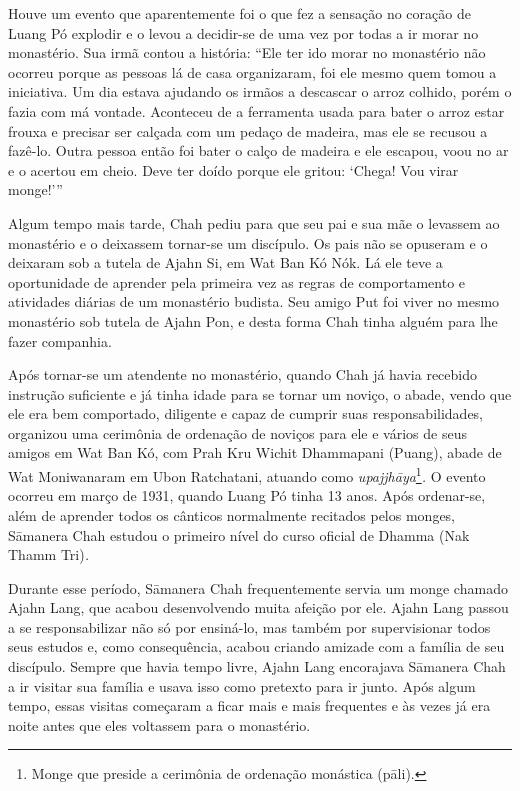 Houve um evento que aparentemente foi o que fez a sensação no coração de
Luang Pó explodir e o levou a decidir-se de uma vez por todas a ir morar
no monastério. Sua irmã contou a história: ``Ele ter ido morar no
monastério não ocorreu porque as pessoas lá de casa organizaram, foi ele
mesmo quem tomou a iniciativa. Um dia estava ajudando os irmãos a
descascar o arroz colhido, porém o fazia com má vontade. Aconteceu de a
ferramenta usada para bater o arroz estar frouxa e precisar ser calçada
com um pedaço de madeira, mas ele se recusou a fazê-lo. Outra pessoa
então foi bater o calço de madeira e ele escapou, voou no ar e o acertou
em cheio. Deve ter doído porque ele gritou: `Chega! Vou virar monge!'''

Algum tempo mais tarde, Chah pediu para que seu pai e sua mãe o levassem
ao monastério e o deixassem tornar-se um discípulo. Os pais não se
opuseram e o deixaram sob a tutela de Ajahn Si, em Wat Ban Kó Nók. Lá
ele teve a oportunidade de aprender pela primeira vez as regras de
comportamento e atividades diárias de um monastério budista. Seu amigo
Put foi viver no mesmo monastério sob tutela de Ajahn Pon, e desta forma
Chah tinha alguém para lhe fazer companhia.

Após tornar-se um atendente no monastério, quando Chah já havia recebido
instrução suficiente e já tinha idade para se tornar um noviço, o abade,
vendo que ele era bem comportado, diligente e capaz de cumprir suas
responsabilidades, organizou uma cerimônia de ordenação de noviços para
ele e vários de seus amigos em Wat Ban Kó, com Prah Kru Wichit
Dhammapani (Puang), abade de Wat Moniwanaram em Ubon Ratchatani, atuando
como \emph{upajjhāya}\footnote{Monge que preside a cerimônia de
  ordenação monástica (pāli).}\emph{.} O evento ocorreu em março de
1931, quando Luang Pó tinha 13 anos. Após ordenar-se, além de aprender
todos os cânticos normalmente recitados pelos monges, Sāmanera Chah
estudou o primeiro nível do curso oficial de Dhamma (Nak Thamm
Tri)\emph{.}

Durante esse período, Sāmanera Chah frequentemente servia um monge
chamado Ajahn Lang, que acabou desenvolvendo muita afeição por ele.
Ajahn Lang passou a se responsabilizar não só por ensiná-lo, mas também
por supervisionar todos seus estudos e, como consequência, acabou
criando amizade com a família de seu discípulo. Sempre que havia tempo
livre, Ajahn Lang encorajava Sāmanera Chah a ir visitar sua família e
usava isso como pretexto para ir junto. Após algum tempo, essas visitas
começaram a ficar mais e mais frequentes e às vezes já era noite antes
que eles voltassem para o monastério.

